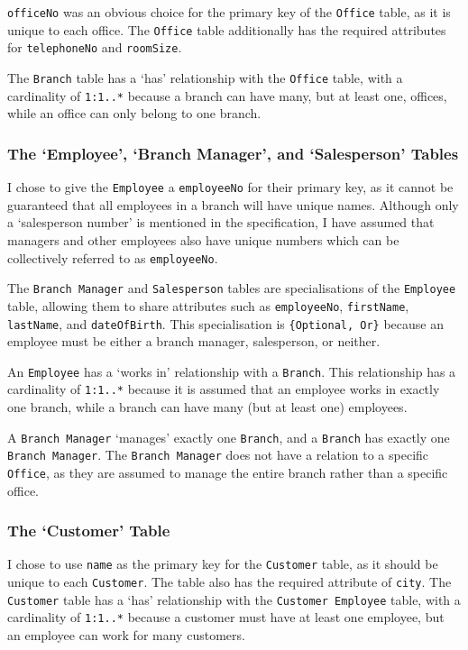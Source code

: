 \documentclass{article}
\begin{document}
\texttt{officeNo} was an obvious choice for the primary key of the \texttt{Office} table, as it is unique to each office. The \texttt{Office} table additionally has the required attributes for \texttt{telephoneNo} and \texttt{roomSize}.

The \texttt{Branch} table has a `has' relationship with the \texttt{Office} table, with a cardinality of \texttt{1:1..*} because a branch can have many, but at least one, offices, while an office can only belong to one branch.

\subsubsection{The `Employee', `Branch Manager', and `Salesperson' Tables}
I chose to give the \texttt{Employee} a \texttt{employeeNo} for their primary key, as it cannot be guaranteed that all employees in a branch will have unique names. Although only a `salesperson number' is mentioned in the specification, I have assumed that managers and other employees also have unique numbers which can be collectively referred to as \texttt{employeeNo}.

The \texttt{Branch Manager} and \texttt{Salesperson} tables are specialisations of the \texttt{Employee} table, allowing them to share attributes such as \texttt{employeeNo}, \texttt{firstName}, \texttt{lastName}, and \texttt{dateOfBirth}. This specialisation is \texttt{\{Optional, Or\}} because an employee must be either a branch manager, salesperson, or neither.

An \texttt{Employee} has a `works in' relationship with a \texttt{Branch}. This relationship has a cardinality of \texttt{1:1..*} because it is assumed that an employee works in exactly one branch, while a branch can have many (but at least one) employees.

A \texttt{Branch Manager} `manages' exactly one \texttt{Branch}, and a \texttt{Branch} has exactly one \texttt{Branch Manager}. The \texttt{Branch Manager} does not have a relation to a specific \texttt{Office}, as they are assumed to manage the entire branch rather than a specific office.

\subsubsection{The `Customer' Table}
I chose to use \texttt{name} as the primary key for the \texttt{Customer} table, as it should be unique to each \texttt{Customer}. The table also has the required attribute of \texttt{city}. The \texttt{Customer} table has a `has' relationship with the \texttt{Customer Employee} table, with a cardinality of \texttt{1:1..*} because a customer must have at least one employee, but an employee can work for many customers.
\end{document}
